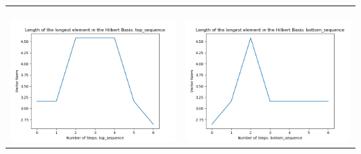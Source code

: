 \documentclass[10pt]{article}
\begin{document}
\begin{tabular}{c|c}
\begin{minipage}{.45\textwidth}
\end{minipage} \\ \\
\hline \\\begin{minipage}{.45\textwidth}
\includegraphics[width=\textwidth]{"DATA/5d/6 generators 1 bound I/top_sequence LENGTH"}
\end{minipage} &
\begin{minipage}{.45\textwidth}
\includegraphics[width=\textwidth]{"DATA/5d/6 generators 1 bound I bottomup/bottom_sequence LENGTH"}
\end{minipage}
\end{tabular}
\end{document}
